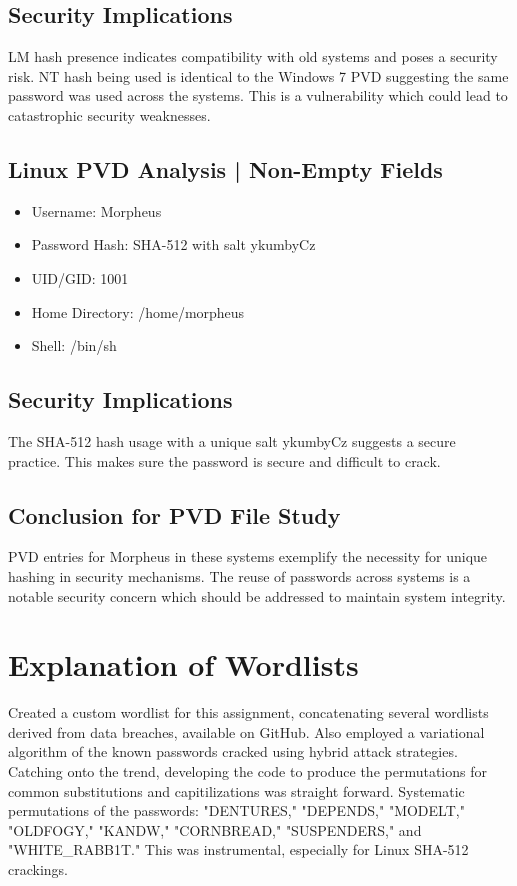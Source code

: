 \documentclass{article}
\begin{document}
\subsection{Security Implications}

LM hash presence indicates compatibility with old systems and poses a security risk. NT hash being used is identical to the Windows 7 PVD suggesting the same password was used across the systems. This is a vulnerability which could lead to catastrophic security weaknesses. 

\subsection{Linux PVD Analysis | Non-Empty Fields}
\begin{itemize}
    \item Username: Morpheus
    \item Password Hash: SHA-512 with salt ykumbyCz
    \item UID/GID: 1001
    \item Home Directory: /home/morpheus
    \item Shell: /bin/sh
\end{itemize}

\subsection{Security Implications}
The SHA-512 hash usage with a unique salt ykumbyCz suggests a secure practice. This makes sure the password is secure and difficult to crack. 

\subsection{Conclusion for PVD File Study}

PVD entries for Morpheus in these systems exemplify the necessity for unique hashing in security mechanisms. The reuse of passwords across systems is a notable security concern which should be addressed to maintain system integrity.

\vspace{-0.35cm}
\section*{Explanation of Wordlists}
Created a custom wordlist for this assignment, concatenating several wordlists derived from data breaches, available on GitHub.  Also employed a variational algorithm of the known passwords cracked using hybrid attack strategies. Catching onto the trend, developing the code to produce the permutations for common substitutions and capitilizations was straight forward. Systematic permutations of the passwords: "DENTURES," "DEPENDS," "MODELT," "OLDFOGY," "KANDW," "CORNBREAD," "SUSPENDERS," and "WHITE\_RABB1T." This was instrumental, especially for Linux SHA-512 crackings.
\end{document}
